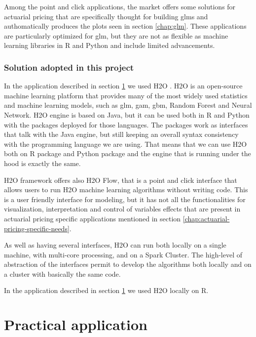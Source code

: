 \documentclass[a4paper, twoside, openright, 12pt]{report}
\theoremstyle{definition}
\theoremstyle{definition}
\theoremstyle{definition}
\theoremstyle{remark}
\begin{document}
Among the point and click applications, the market offers some solutions for actuarial pricing that are specifically thought for building \ac{glm}s and authomatically produces the plots seen in section \ref{chap:glm}. These applications are particularly optimized for \ac{glm}, but they are not as flexible as machine learning libraries in R and Python and include limited advancements.

\hypertarget{solution-adopted-in-this-project}{%
\subsection{Solution adopted in this project}\label{solution-adopted-in-this-project}}

In the application described in section \ref{chap:practical-app} we used H2O \autocite{h2o_platform}. H2O is an open-source machine learning platform that provides many of the most widely used statistics and machine learning models, such as \ac{glm}, \ac{gam}, \ac{gbm}, Random Forest and Neural Network. H2O engine is based on Java, but it can be used both in R and Python with the packages deployed for those languages. The packages work as interfaces that talk with the Java engine, but still keeping an overall syntax consistency with the programming language we are using. That means that we can use H2O both on R package and Python package and the engine that is running under the hood is exactly the same.

H2O framework offers also H2O Flow, that is a point and click interface that allows users to run H2O machine learning algorithms without writing code. This is a user friendly interface for modeling, but it has not all the functionalities for visualization, interpretation and control of variables effects that are present in actuarial pricing specific applications mentioned in section \ref{chap:actuarial-pricing-specific-needs}.

As well as having several interfaces, H2O can run both locally on a single machine, with multi-core processing, and on a Spark Cluster. The high-level of abstraction of the interfaces permit to develop the algorithms both locally and on a cluster with basically the same code.

In the application described in section \ref{chap:practical-app} we used H2O locally on R.

\hypertarget{chap:practical-app}{%
\chapter{Practical application}\label{chap:practical-app}}
\end{document}
